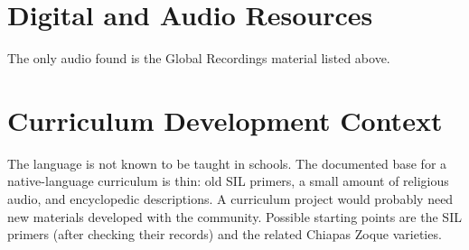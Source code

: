 \documentclass[12pt]{article}
\begin{document}
\section{Digital and Audio Resources}
The only audio found is the Global Recordings material listed above.

\section{Curriculum Development Context}
The language is not known to be taught in schools. The documented base for a native-language curriculum is thin: old SIL primers, a small amount of religious audio, and encyclopedic descriptions. A curriculum project would probably need new materials developed with the community. Possible starting points are the SIL primers (after checking their records) and the related Chiapas Zoque varieties.
\end{document}
